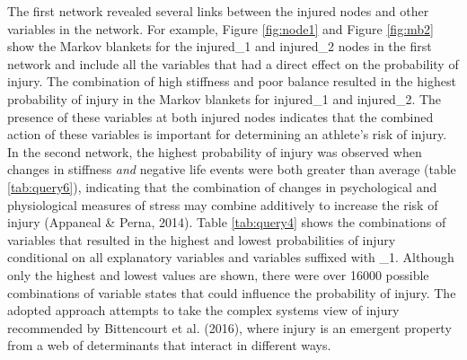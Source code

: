 \documentclass[man,floatsintext]{apa6}
\begin{document}
The first network revealed several links between the injured nodes and other variables in the network.
For example, Figure \ref{fig:node1} and Figure \ref{fig:mb2} show the Markov blankets for the injured\_1 and injured\_2 nodes in the first network and include all the variables that had a direct effect on the probability of injury.
The combination of high stiffness and poor balance resulted in the highest probability of injury in the Markov blankets for injured\_1 and injured\_2.
The presence of these variables at both injured nodes indicates that the combined action of these variables is important for determining an athlete's risk of injury.
In the second network, the highest probability of injury was observed when changes in stiffness \emph{and} negative life events were both greater than average (table \ref{tab:query6}), indicating that the combination of changes in psychological and physiological measures of stress may combine additively to increase the risk of injury (Appaneal \& Perna, 2014).
Table \ref{tab:query4} shows the combinations of variables that resulted in the highest and lowest probabilities of injury conditional on all explanatory variables and variables suffixed with \_1.
Although only the highest and lowest values are shown, there were over 16000 possible combinations of variable states that could influence the probability of injury.
The adopted approach attempts to take the complex systems view of injury recommended by Bittencourt et al. (2016), where injury is an emergent property from a web of determinants that interact in different ways.
\end{document}
